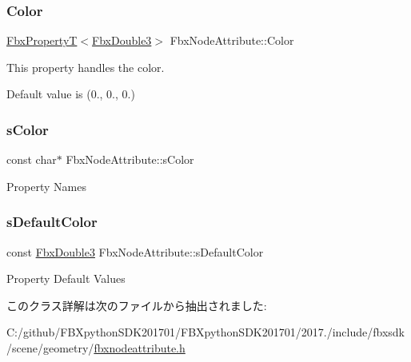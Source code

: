 \subsubsection{\texorpdfstring{Color}{Color}}
{\footnotesize\ttfamily \hyperlink{class_fbx_property_t}{Fbx\+PropertyT}$<$\hyperlink{fbxtypes_8h_ae0a96f14cde566774c7553aa7523b7a7}{Fbx\+Double3}$>$ Fbx\+Node\+Attribute\+::\+Color}

This property handles the color.

Default value is (0., 0., 0.) \mbox{\label{class_fbx_node_attribute_a0155b227cd9d72c796155bdda2c4c9e5}} 
\subsubsection{\texorpdfstring{s\+Color}{sColor}}
{\footnotesize\ttfamily const char$\ast$ Fbx\+Node\+Attribute\+::s\+Color\hspace{0.3cm}{\ttfamily [static]}}



Property Names 

\mbox{\label{class_fbx_node_attribute_a06cca505ad9c2964060cbcb3bbf6795b}} 
\subsubsection{\texorpdfstring{s\+Default\+Color}{sDefaultColor}}
{\footnotesize\ttfamily const \hyperlink{fbxtypes_8h_ae0a96f14cde566774c7553aa7523b7a7}{Fbx\+Double3} Fbx\+Node\+Attribute\+::s\+Default\+Color\hspace{0.3cm}{\ttfamily [static]}}



Property Default Values 



このクラス詳解は次のファイルから抽出されました\+:\begin{DoxyCompactItemize}
\item 
C\+:/github/\+F\+B\+Xpython\+S\+D\+K201701/\+F\+B\+Xpython\+S\+D\+K201701/2017./include/fbxsdk/scene/geometry/\hyperlink{fbxnodeattribute_8h}{fbxnodeattribute.\+h}\end{DoxyCompactItemize}
